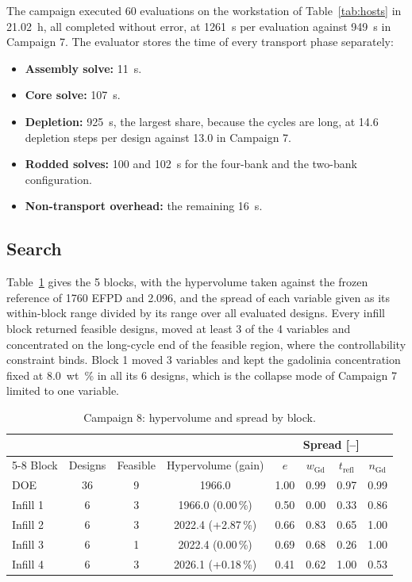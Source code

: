 The campaign executed 60 evaluations on the workstation of
Table~\ref{tab:hosts} in \SI{21.02}{h}, all completed without error, at
\SI{1261}{s} per evaluation against \SI{949}{s} in Campaign 7. The
evaluator stores the time of every transport phase separately:

\begin{itemize}
  \item \textbf{Assembly solve:} \SI{11}{s}.

  \item \textbf{Core solve:} \SI{107}{s}.

  \item \textbf{Depletion:} \SI{925}{s}, the largest share, because the
        cycles are long, at 14.6 depletion steps per design against 13.0
        in Campaign 7.

  \item \textbf{Rodded solves:} \num{100} and \SI{102}{s} for the
        four-bank and the two-bank configuration.

  \item \textbf{Non-transport overhead:} the remaining \SI{16}{s}.
\end{itemize}

\subsection{Search}
\label{sec:res-c8-blocks}

Table~\ref{tab:c8-blocks} gives the 5 blocks, with the hypervolume
taken against the frozen reference of 1760 EFPD and 2.096, and the
spread of each variable given as its within-block range divided by its
range over all evaluated designs. Every infill block returned feasible
designs, moved at least 3 of the 4 variables and concentrated on the
long-cycle end of the feasible region, where the controllability
constraint binds. Block 1 moved 3 variables and kept the gadolinia
concentration fixed at \SI{8.0}{wt\%} in all its 6 designs, which is
the collapse mode of Campaign 7 limited to one variable.

\begin{table}[htbp]
  \centering
  \caption{Campaign 8: hypervolume and spread by block.}
  \label{tab:c8-blocks}
  \begin{tabular}{lccccccc}
    \toprule
    & & & & \multicolumn{4}{c}{Spread [--]} \\
    \cmidrule(l){5-8}
    Block & Designs & Feasible & Hypervolume (gain) & $e$ & $w_\mathrm{Gd}$ & $t_\mathrm{refl}$ & $n_\mathrm{Gd}$ \\
    \midrule
    DOE      & 36 & 9 & 1966.0             & 1.00 & 0.99 & 0.97 & 0.99 \\
    Infill 1 &  6 & 3 & 1966.0 (0.00\,\%)  & 0.50 & 0.00 & 0.33 & 0.86 \\
    Infill 2 &  6 & 3 & 2022.4 (+2.87\,\%) & 0.66 & 0.83 & 0.65 & 1.00 \\
    Infill 3 &  6 & 1 & 2022.4 (0.00\,\%)  & 0.69 & 0.68 & 0.26 & 1.00 \\
    Infill 4 &  6 & 3 & 2026.1 (+0.18\,\%) & 0.41 & 0.62 & 1.00 & 0.53 \\
    \bottomrule
  \end{tabular}
\end{table}

